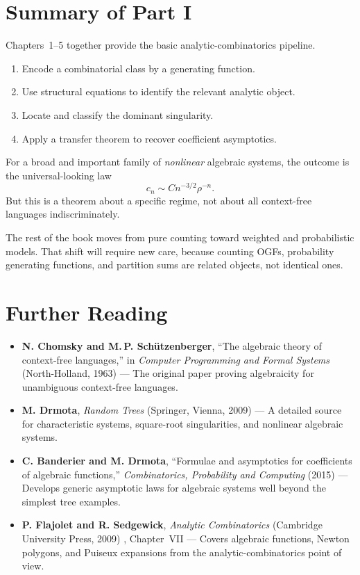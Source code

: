 \section*{Summary of Part I}

Chapters~1--5 together provide the basic analytic-combinatorics pipeline.
\begin{enumerate}
  \item Encode a combinatorial class by a generating function.
  \item Use structural equations to identify the relevant analytic object.
  \item Locate and classify the dominant singularity.
  \item Apply a transfer theorem to recover coefficient asymptotics.
\end{enumerate}

For a broad and important family of \emph{nonlinear} algebraic systems, the outcome is the universal-looking law
\[
  c_n \sim C n^{-3/2}\rho^{-n}.
\]
But this is a theorem about a specific regime, not about all context-free languages indiscriminately.

The rest of the book moves from pure counting toward weighted and probabilistic models. That shift will require new care, because counting OGFs, probability generating functions, and partition sums are related objects, not identical ones.

\section*{Further Reading}

\begin{itemize}
  \item \textbf{N. Chomsky and M.\,P. Sch\"utzenberger}, ``The algebraic theory of context-free languages,'' in \emph{Computer Programming and Formal Systems} (North-Holland, 1963) \cite{ChomskySchutzenberger1963} --- The original paper proving algebraicity for unambiguous context-free languages.

  \item \textbf{M. Drmota}, \emph{Random Trees} (Springer, Vienna, 2009) \cite{Drmota2009} --- A detailed source for characteristic systems, square-root singularities, and nonlinear algebraic systems.

  \item \textbf{C. Banderier and M. Drmota}, ``Formulae and asymptotics for coefficients of algebraic functions,'' \emph{Combinatorics, Probability and Computing} (2015) \cite{BanderierDrmota2015} --- Develops generic asymptotic laws for algebraic systems well beyond the simplest tree examples.

  \item \textbf{P. Flajolet and R. Sedgewick}, \emph{Analytic Combinatorics} (Cambridge University Press, 2009) \cite{FlajoletSedgewick2009}, Chapter~VII --- Covers algebraic functions, Newton polygons, and Puiseux expansions from the analytic-combinatorics point of view.
\end{itemize}
